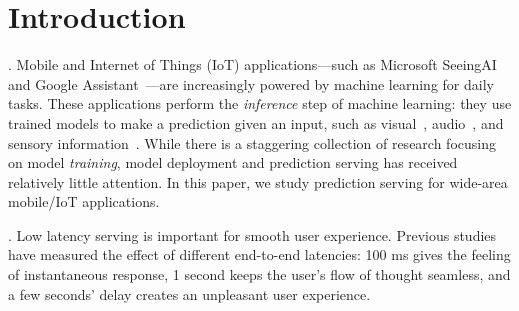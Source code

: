 \section{Introduction}
\label{sec:introduction}

. Mobile and Internet of Things (IoT) applications---such as
Microsoft SeeingAI~\cite{seeingai} and Google
Assistant~\cite{googleassistant}---are increasingly powered by machine learning
for daily tasks. These applications perform the \textit{inference} step of
machine learning: they use trained models to make a prediction given an input,
such as visual~\cite{googlelens, ha2014towards, seeingai}, audio~\cite{alexa,
  applesiri, cortana}, and sensory information~\cite{laput2017synthetic,
  lu2010jigsaw}. While there is a staggering collection of research focusing on
model \textit{training}, model deployment and prediction serving has received
relatively little attention.  In this paper, we study prediction serving for
wide-area mobile/IoT applications.

. Low
latency serving is important for smooth user experience. Previous
studies~\cite{nielsen1994usability, schneiderman1998designing} have measured the
effect of different end-to-end latencies: 100 ms gives the feeling of
instantaneous response, 1 second keeps the user's flow of thought seamless, and
a few seconds' delay creates an unpleasant user experience.





